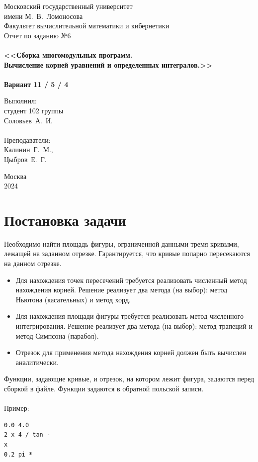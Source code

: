 \documentclass[a4paper,12pt,titlepage,finall]{article}
\begin{document}
\begin{titlepage}
    \begin{center}
	{\small \sc Московский государственный университет \\имени М.~В.~Ломоносова\\
	Факультет вычислительной математики и кибернетики\\}
	\vfill
	{\Large \sc Отчет по заданию №6}\\
	~\\
	{\large \bf <<Сборка многомодульных программ. \\
	Вычисление корней уравнений и определенных интегралов.>>}\\ 
	~\\
	{\large \bf Вариант 11 / 5 / 4}
    \end{center}
    \begin{flushright}
	\vfill {Выполнил:\\
	студент 102 группы\\
	Соловьев~А.~И.\\
	~\\
	Преподаватели:\\
	Калинин~Г.~М.,\\Цыбров~Е.~Г.}
    \end{flushright}
    \begin{center}
	\vfill
	{\small Москва\\2024}
    \end{center}
\end{titlepage}

\tableofcontents
\newpage

\section{Постановка задачи}

Необходимо найти площадь фигуры, ограниченной данными тремя кривыми, лежащей на заданном отрезке. Гарантируется, что кривые попарно пересекаются на данном отрезке. 
\begin{itemize}
    \item Для нахождения точек пересечений требуется реализовать численный метод нахождения корней. Решение реализует два метода (на выбор): метод Ньютона (касательных) и метод хорд.
    \item Для нахождения площади фигуры требуется реализовать метод численного интегрирования. Решение реализует два метода (на выбор): метод трапеций и метод Симпсона (парабол).
\item Отрезок для применения метода нахождения корней должен быть вычислен аналитически.
\end{itemize}
Функции, задающие кривые, и отрезок, на котором лежит фигура, задаются перед сборкой в файле. Функции задаются в обратной польской записи.\\\\
Пример:
\begin{verbatim}
0.0 4.0
2 x 4 / tan -
x
0.2 pi *
\end{verbatim}
\end{document}

